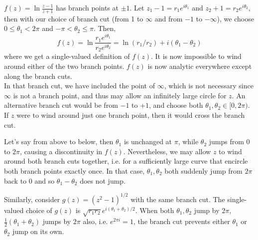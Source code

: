 \documentclass[a4paper]{article}
\begin{document}
\begin{eg}
$f(z)=\ln\frac{z-1}{z+1}$ has branch points at $\pm 1$. Let $z_1-1=r_1e^{i\theta_1}$ and $z_2+1=r_2e^{i\theta_2}$, then with our choice of branch cut (from 1 to $\infty$ and from $-1$ to $-\infty$), we choose $0\leq\theta_1<2\pi$ and $-\pi<\theta_2\leq\pi$. Then,
$$f(z)=\ln\frac{r_1e^{i\theta_1}}{r_2e^{i\theta_2}}=\ln(r_1/r_2)+i(\theta_1-\theta_2)$$
where we get a single-valued definition of $f(z)$. It is now impossible to wind around either of the two branch points. $f(z)$ is now analytic everywhere except along the branch cuts.\\[5pt]
In that branch cut, we have included the point of $\infty$, which is not necessary since $\infty$ is not a branch point, and thus may allow an infinitely large circle for $z$. An alternative branch cut would be from $-1$ to $+1$, and choose both $\theta_1,\theta_2\in[0,2\pi)$. If $z$ were to wind around just one branch point, then it would cross the branch cut.
\begin{center}
\end{center}
Let's say from above to below, then $\theta_1$ is unchanged at $\pi$, while $\theta_2$ jumps from 0 to $2\pi$, causing a discontinuity in $f(z)$. Nevertheless, we may allow $z$ to wind around both branch cuts together, i.e. for a sufficiently large curve that encircle both branch points exactly once. In that case, $\theta_1,\theta_2$ both suddenly jump from $2\pi$ back to 0 and so $\theta_1-\theta_2$ does not jump.
\end{eg}
\begin{eg}
Similarly, consider $g(z)=(z^2-1)^{1/2}$ with the same branch cut. The single-valued choice of $g(z)$ is $\sqrt{r_1r_2}e^{i(\theta_1+\theta_2)/2}$. When both $\theta_1,\theta_2$ jump by $2\pi$, $\frac{1}{2}(\theta_1+\theta_2)$ jumps by $2\pi$ also, i.e. $e^{2\pi i}=1$, the branch cut prevents either $\theta_1$ or $\theta_2$ jump on its own.
\end{eg}
\newpage
\end{document}
